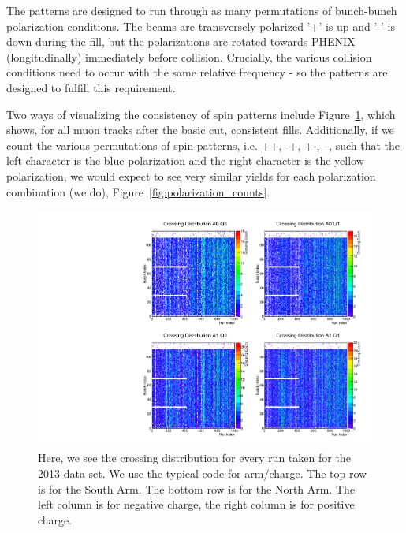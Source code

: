 The patterns are designed to run through as many permutations of bunch-bunch
polarization conditions. The beams are transversely polarized '+' is up and '-'
is down during the fill, but the polarizations are rotated towards PHENIX
(longitudinally) immediately before collision. Crucially, the various collision
conditions need to occur with the same relative frequency - so the patterns are
designed to fulfill this requirement.

Two ways of visualizing the consistency of spin patterns include
Figure~\ref{fig:crossing_count}, which shows, for all muon tracks after the
basic cut, consistent fills. Additionally, if we count the various permutations
of spin patterns, i.e. ++, -+, +-, --, such that the left character is the blue
polarization and the right character is the yellow polarization, we would expect
to see very similar yields for each polarization combination (we do),
Figure~\ref{fig:polarization_counts}.

\begin{figure}
  \centering
  \includegraphics[width=\linewidth]{./figures/crossing_distribution.pdf}
  \caption{
    Here, we see the crossing distribution for every run taken for the 2013 data
    set. We use the typical code for arm/charge. The top row is for the South
    Arm. The bottom row is for the North Arm. The left column is for negative
    charge, the right column is for positive charge.
  }
  \label{fig:crossing_count}
\end{figure}

